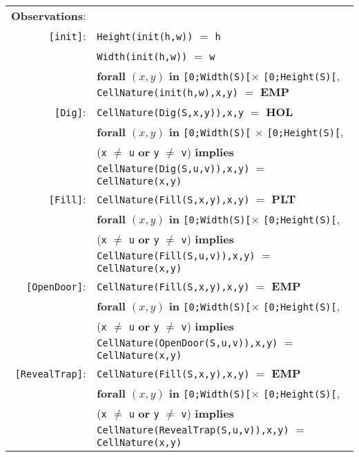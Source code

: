 \documentclass[7pt]{article}
\begin{document}
\begin{tabular}{rl}
       \textbf{Observations}: & \\
       \texttt{[init]}: & \texttt{Height(init(h,w))} $=$ \texttt{h} \\
       & \texttt{Width(init(h,w))} $=$ \texttt{w} \\
       & \textbf{forall} $(x,y)$ \textbf{in} \texttt{[0;Width(S)[}$\times$ \texttt{[0;Height(S)[},~ \texttt{CellNature(init(h,w),x,y)} $=$ \textbf{EMP} \\
       \texttt{[Dig]}: & \texttt{CellNature(Dig(S,x,y)),x,y} $=$ \textbf{HOL} \\
        & \textbf{forall} $(x,y)$ \textbf{in} \texttt{[0;Width(S)[} $\times$ \texttt{[0;Height(S)[}, \\ & \quad\quad\quad\quad (\texttt{x} $\neq$ \texttt{u} \textbf{or} \texttt{y} $\neq$ \texttt{v}) \textbf{implies} \texttt{CellNature(Dig(S,u,v)),x,y)} $=$ \texttt{CellNature(x,y)} \\
       \texttt{[Fill]}: & \texttt{CellNature(Fill(S,x,y),x,y)} $=$ \textbf{PLT} \\
       & \textbf{forall} $(x,y)$ \textbf{in} \texttt{[0;Width(S)[}$\times$ \texttt{[0;Height(S)[}, \\ & \quad\quad\quad\quad (\texttt{x} $\neq$ \texttt{u} \textbf{or} \texttt{y} $\neq$ \texttt{v}) \textbf{implies} \texttt{CellNature(Fill(S,u,v)),x,y)} $=$ \texttt{CellNature(x,y)} \\
       \texttt{[OpenDoor]}: & \texttt{CellNature(Fill(S,x,y),x,y)} $=$ \textbf{EMP} \\
       & \textbf{forall} $(x,y)$ \textbf{in} \texttt{[0;Width(S)[}$\times$ \texttt{[0;Height(S)[}, \\ & \quad\quad\quad\quad (\texttt{x} $\neq$ \texttt{u} \textbf{or} \texttt{y} $\neq$ \texttt{v}) \textbf{implies} \texttt{CellNature(OpenDoor(S,u,v)),x,y)} $=$ \texttt{CellNature(x,y)} \\
       \texttt{[RevealTrap]}: & \texttt{CellNature(Fill(S,x,y),x,y)} $=$ \textbf{EMP} \\
       & \textbf{forall} $(x,y)$ \textbf{in} \texttt{[0;Width(S)[}$\times$ \texttt{[0;Height(S)[}, \\ & \quad\quad\quad\quad (\texttt{x} $\neq$ \texttt{u} \textbf{or} \texttt{y} $\neq$ \texttt{v}) \textbf{implies} \texttt{CellNature(RevealTrap(S,u,v)),x,y)} $=$ \texttt{CellNature(x,y)} \\
\end{tabular}

\newpage
\end{document}
